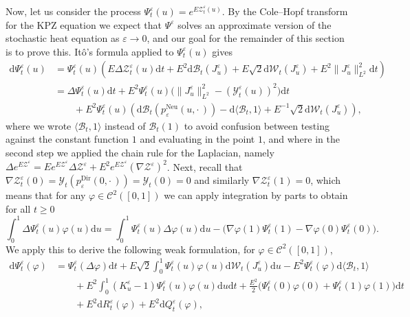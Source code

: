 \documentclass[10pt]{amsart}
\theoremstyle{definition}\newtheorem{defi}[theo]{Definition}\newtheorem{rema}[theo]{Remark}\newtheorem{exam}[theo]{Example}\newtheorem{exem}[theo]{Example}\newtheorem{nota}[theo]{Notation}
\DeclareMathOperator{\Dir}{Dir}
\DeclareMathOperator{\Neu}{Neu}
\newcommand{\mc}[1]{{\mathcal #1}}
\renewcommand{\mc}[1]{{\mathcal #1}}
\renewcommand{\geq}{\geqslant}
\newcommand*{\dd}{\mathrm{d}}
\newcommand*{\dt}{\dd t}
\newcommand*{\du}{\dd u}
\begin{document}
Now, let us consider the process $\Psi^{\varepsilon}_t (u) = e^{E \mc Z^{\varepsilon}_t (u)}$. By the Cole--Hopf transform for the KPZ equation we expect that $\Psi^\varepsilon$ solves an approximate version of the stochastic heat equation as $\varepsilon \to 0$, and our goal for the remainder of this section is to prove this. It\^o's formula applied to $\Psi_t^\varepsilon(u)$ gives
\begin{align*}
\dd \Psi^{\varepsilon}_t (u) & = \Psi^{\varepsilon}_t (u) \left(E
\Delta \mc Z^{\varepsilon}_t (u) \dt + E^2 \dd \mathcal{B}_t (J^{\varepsilon}_u) + E \sqrt{2} \dd\mc W_t (J^{\varepsilon}_u) + E^2 \| J^{\varepsilon}_u \|_{L^2}^2 \dt \right)\\
& = \Delta \Psi^{\varepsilon}_t (u) \dt + E^2
\Psi^{\varepsilon}_t (u) \big(\| J^{\varepsilon}_u \|_{L^2}^2 - (\mc Y^{\varepsilon}_t (u))^2\big) \dt \\
&\qquad + E^2 \Psi^{\varepsilon}_t (u) \left(\dd \mathcal{B}_t(p^{\Neu}_\varepsilon(u,\cdot\,)) - \dd \langle \mathcal{B}_t, 1 \rangle + E^{- 1} \sqrt{2} \dd\mc W_t (J^{\varepsilon}_u)\right),
\end{align*}
where we wrote $\langle \mathcal{B}_t, 1 \rangle$ instead of $\mathcal{B}_t (1)$ to avoid confusion between testing against the constant function $1$ and evaluating in the point $1$, and where in the second step we applied the chain rule for the Laplacian, namely $\Delta e^{E\mc Z^\varepsilon} = E e^{E\mc Z^\varepsilon} \Delta \mc Z^\varepsilon + E^2 e^{E\mc Z^\varepsilon} (\nabla \mc Z^\varepsilon)^2$. Next, recall that $\nabla\mc Z^{\varepsilon}_t (0) = \mc Y_t(p_\varepsilon^{\Dir}(0,\cdot\,)) = \mc Y_t(0) = 0$ and similarly $\nabla \mc Z^{\varepsilon}_t (1) = 0$, which means that for any $\varphi \in \mc C^2 ([0, 1])$ we can apply integration by parts to obtain for all $t \geq 0$
\[
\int_0^1 \Delta \Psi^{\varepsilon}_t (u) \varphi (u) \du = \int_0^1 \Psi^{\varepsilon}_t (u) \Delta \varphi (u) \du - \big(\nabla
\varphi (1) \Psi^{\varepsilon}_t (1) - \nabla \varphi (0)
\Psi^{\varepsilon}_t (0)\big).
\]
We apply this to derive the following weak formulation, for $\varphi \in \mc C^2 ([0, 1])$,
\begin{align*}
\dd \Psi^{\varepsilon}_t (\varphi) & = \Psi^{\varepsilon}_t (\Delta \varphi) \dt + E \sqrt{2}\int_0^1 \Psi^{\varepsilon}_t (u) \varphi (u) \dd\mc W_t (J^{\varepsilon}_u) \du - E^2 \Psi^{\varepsilon}_t (\varphi) \dd \langle \mathcal{B}_t, 1 \rangle\\
&\qquad + E^2 \int_0^1 (K^{\varepsilon}_u - 1)\Psi^{\varepsilon}_t (u)\varphi (u) \du \dt + \frac{E^2}{2} \big(\Psi^\varepsilon_t(0)\varphi(0) + \Psi^\varepsilon_t(1)\varphi(1)\big)\dt \\
&\qquad + E^2 \dd R^{\varepsilon}_t (\varphi) + E^2 \dd Q^{\varepsilon}_t (\varphi),\phantom{\frac11}
\end{align*}
\end{document}
